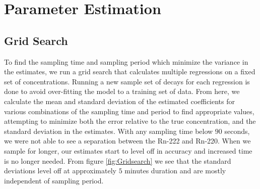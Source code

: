 \documentclass[11pt]{m2pi}
\begin{document}
\section{Parameter Estimation}\label{S:ParameterEstimation}
\subsection{Grid Search}\label{SS:GridSearch}
To find the sampling time and sampling period which minimize the variance in the estimates, we run a grid search that calculates multiple regressions on a fixed set of concentrations. Running a new sample set of decays for each regression is done to avoid over-fitting the model to a training set of data. From here, we calculate the mean and standard deviation of the estimated coefficients for various combinations of the sampling time and period to find appropriate values, attempting to minimize both the error relative to the true concentration, and the standard deviation in the estimates. With any sampling time below $90$ seconds, we were not able to see a separation between the Rn-222 and Rn-220.
When we sample for longer, our estimates start to level off in accuracy and increased time is no longer needed. From figure \ref{fig:Gridsearch} we see that the standard deviations level off at approximately $5$ minutes duration and are mostly independent of sampling period. \\%
\end{document}
